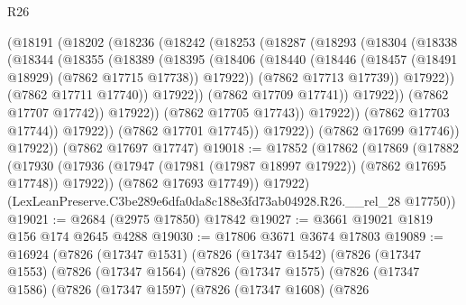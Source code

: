 \begin{lexlean}{R26}
\begin{coremodule}
                        (@18191
                          (@18202
                            (@18236
                              (@18242
                                (@18253
                                  (@18287
                                    (@18293
                                      (@18304
                                        (@18338
                                          (@18344
                                            (@18355
                                              (@18389
                                                (@18395
                                                  (@18406
                                                    (@18440
                                                      (@18446
                                                        (@18457
                                                          (@18491 @18929)
                                                          (@7862 @17715 @17738))
                                                        @17922))
                                                    (@7862 @17713 @17739))
                                                  @17922))
                                              (@7862 @17711 @17740))
                                            @17922))
                                        (@7862 @17709 @17741))
                                      @17922))
                                  (@7862 @17707 @17742))
                                @17922))
                            (@7862 @17705 @17743))
                          @17922))
                      (@7862 @17703 @17744))
                    @17922))
                (@7862 @17701 @17745))
              @17922))
          (@7862 @17699 @17746))
        @17922))
    (@7862 @17697 @17747)
@19018 := @17852
    (@17862
      (@17869
        (@17882
          (@17930 (@17936 (@17947 (@17981 (@17987 @18997 @17922)) (@7862 @17695 @17748)) @17922))
          (@7862 @17693 @17749))
        @17922)
      (LexLeanPreserve.C3be289e6dfa0da8c188e3fd73ab04928.R26.__rel_28 @17750))
@19021 := @2684 (@2975 @17850) @17842
@19027 := @3661 @19021 @1819 @156 @174 @2645 @4288
@19030 := @17806 @3671 @3674 @17803
@19089 := @16924
    (@7826
      (@17347 @1531)
      (@7826
        (@17347 @1542)
        (@7826
          (@17347 @1553)
          (@7826
            (@17347 @1564)
            (@7826
              (@17347 @1575)
              (@7826
                (@17347 @1586)
                (@7826
                  (@17347 @1597)
                  (@7826
                    (@17347 @1608)
                    (@7826

\end{coremodule}
\end{lexlean}
